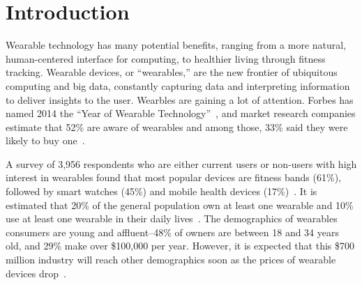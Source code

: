 \documentclass{acm_proc_article-sp}
\begin{document}





\section{Introduction}
Wearable technology has many potential benefits, ranging from a more natural, human-centered interface for computing, to healthier living through fitness tracking. Wearable devices, or ``wearables,'' are the new frontier of ubiquitous computing and big data, constantly capturing data and interpreting information to deliver insights to the user. Wearbles are gaining a lot of attention. Forbes has named 2014 the ``Year of Wearable Technology''~\cite{Forbes}, and market research companies estimate that 52\% are aware of wearables and among those, 33\% said they were likely to buy one~\cite{NPD}. 

A survey of 3,956 respondents who are either current users or non-users with high interest in wearables found that most popular devices are fitness bands (61\%), followed by smart watches (45\%) and mobile health devices (17\%)~\cite{Nilsen}. It is estimated that 20\% of the general population own at least one wearable and 10\% use at least one wearable in their daily lives~\cite{WearableStatNews}. The demographics of wearables consumers are young and affluent--48\% of owners are between 18 and 34 years old, and 29\% make over \$100,000 per year. However, it is expected that this \$700 million industry will reach other demographics soon as the prices of wearable devices drop~\cite{cmo}. 
\end{document}
